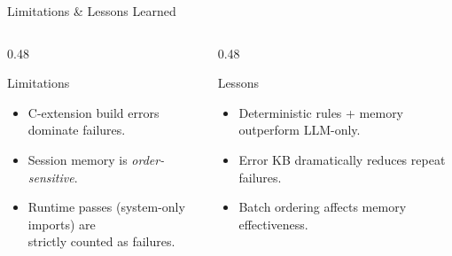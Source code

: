 \documentclass[aspectratio=169]{beamer}
\begin{document}
\begin{frame}{Limitations \& Lessons Learned}
\begin{columns}[T]

\begin{column}{0.48\textwidth}
\begin{alertblock}{\faExclamationCircle\quad Limitations}
\begin{itemize}\small
  \item C-extension build errors dominate failures.
  \item Session memory is \emph{order-sensitive}.
  \item Runtime passes (system-only imports) are\\
        strictly counted as failures.
\end{itemize}
\end{alertblock}
\end{column}

\begin{column}{0.48\textwidth}
\begin{exampleblock}{\faGraduationCap\quad Lessons}
\begin{itemize}\small
  \item Deterministic rules + memory outperform LLM-only.
  \item Error KB dramatically reduces repeat failures.
  \item Batch ordering affects memory effectiveness.
\end{itemize}
\end{exampleblock}
\end{column}

\end{columns}

\vspace{0.8em}
\begin{center}
\end{center}
\end{frame}
\end{document}
